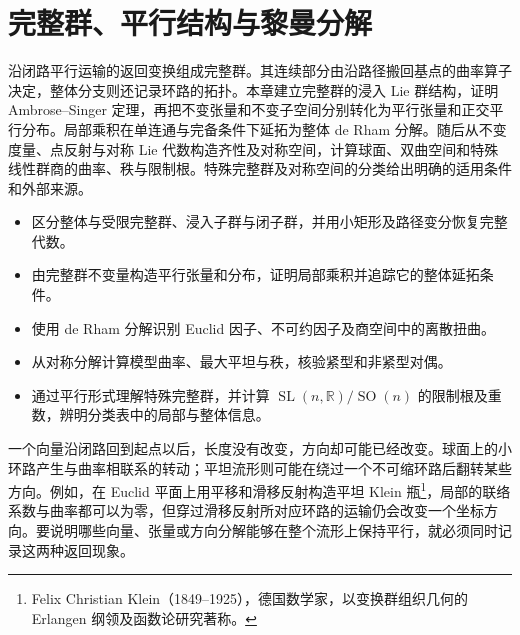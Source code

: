 
% 
% 

\chapter{完整群、平行结构与黎曼分解}
\label{g3:ch:05}

\begin{chapterabstract}
	沿闭路平行运输的返回变换组成完整群。其连续部分由沿路径搬回基点的曲率算子决定，整体分支则还记录环路的拓扑。本章建立完整群的浸入 Lie 群结构，证明 Ambrose--Singer 定理，再把不变张量和不变子空间分别转化为平行张量和正交平行分布。局部乘积在单连通与完备条件下延拓为整体 de Rham 分解。随后从不变度量、点反射与对称 Lie 代数构造齐性及对称空间，计算球面、双曲空间和特殊线性群商的曲率、秩与限制根。特殊完整群及对称空间的分类给出明确的适用条件和外部来源。
\end{chapterabstract}

\begin{learninggoals}
	\begin{itemize}
		\item 区分整体与受限完整群、浸入子群与闭子群，并用小矩形及路径变分恢复完整代数。
		\item 由完整群不变量构造平行张量和分布，证明局部乘积并追踪它的整体延拓条件。
		\item 使用 de Rham 分解识别 Euclid 因子、不可约因子及商空间中的离散扭曲。
		\item 从对称分解计算模型曲率、最大平坦与秩，核验紧型和非紧型对偶。
		\item 通过平行形式理解特殊完整群，并计算 \(\operatorname{SL}(n,\mathbb R)/\operatorname{SO}(n)\) 的限制根及重数，辨明分类表中的局部与整体信息。
	\end{itemize}
\end{learninggoals}

一个向量沿闭路回到起点以后，长度没有改变，方向却可能已经改变。球面上的小环路产生与曲率相联系的转动；平坦流形则可能在绕过一个不可缩环路后翻转某些方向。例如，在 Euclid 平面上用平移和滑移反射构造平坦 Klein 瓶\footnote{Felix Christian Klein（1849--1925），德国数学家，以变换群组织几何的 Erlangen 纲领及函数论研究著称。}，局部的联络系数与曲率都可以为零，但穿过滑移反射所对应环路的运输仍会改变一个坐标方向。要说明哪些向量、张量或方向分解能够在整个流形上保持平行，就必须同时记录这两种返回现象。

